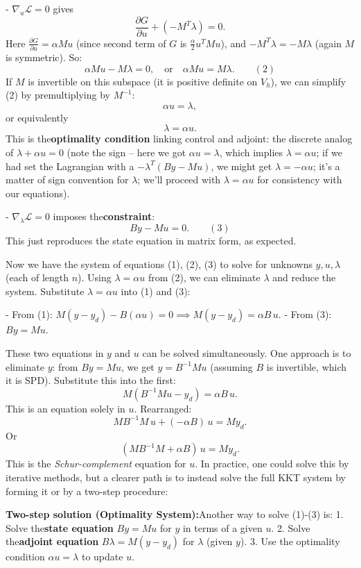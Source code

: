 - \(\nabla_u \mathcal{L} = 0\) gives
\[\frac{\partial G}{\partial u} + (-M^T \lambda) = 0.\]
Here \(\frac{\partial G}{\partial u} = \alpha M u\) (since second term of \(G\) is \(\frac{\alpha}{2} u^T M u\)), and \(-M^T \lambda = -M \lambda\) (again \(M\) is symmetric). So:
\[\alpha M u - M \lambda = 0, \quad \text{or} \quad \alpha M u = M \lambda. \qquad (2)\]
If \(M\) is invertible on this subspace (it is positive definite on \(V_h\)), we can simplify (2) by premultiplying by \(M^{-1}\):
\[\alpha u = \lambda,\]
or equivalently \[\lambda = \alpha u.\]
This is the\textbf{optimality condition} linking control and adjoint: the discrete analog of \(\lambda + \alpha u = 0\) (note the sign – here we got \(\alpha u = \lambda\), which implies \(\lambda = \alpha u\); if we had set the Lagrangian with a \(-\lambda^T(By - Mu)\), we might get \(\lambda = -\alpha u\); it's a matter of sign convention for \(\lambda\); we'll proceed with \(\lambda = \alpha u\) for consistency with our equations).

- \(\nabla_{\lambda} \mathcal{L} = 0\) imposes the\textbf{constraint}:
\[B y - M u = 0. \qquad (3)\]
This just reproduces the state equation in matrix form, as expected.

Now we have the system of equations (1), (2), (3) to solve for unknowns \(y, u, \lambda\) (each of length \(n\)). Using \(\lambda = \alpha u\) from (2), we can eliminate \(\lambda\) and reduce the system. Substitute \(\lambda = \alpha u\) into (1) and (3):

- From (1): \(M(y - y_d) - B(\alpha u) = 0 \implies M(y - y_d) = \alpha B\,u\).
- From (3): \(B y = M u\).

These two equations in \(y\) and \(u\) can be solved simultaneously. One approach is to eliminate \(y\): from \(B y = M u\), we get \(y = B^{-1} M u\) (assuming \(B\) is invertible, which it is SPD). Substitute this into the first:
\[M(B^{-1} M u - y_d) = \alpha B\, u.\]
This is an equation solely in \(u\). Rearranged:
\[M B^{-1} M\, u + (-\alpha B)\, u = M y_d.\]
Or
\[(M B^{-1} M + \alpha B)\, u = M y_d.\]
This is the \emph{Schur-complement} equation for \(u\). In practice, one could solve this by iterative methods, but a clearer path is to instead solve the full KKT system by forming it or by a two-step procedure:

\textbf{Two-step solution (Optimality System):}Another way to solve (1)-(3) is:
1. Solve the\textbf{state equation} \(B y = M u\) for \(y\) in terms of a given \(u\).
2. Solve the\textbf{adjoint equation} \(B \lambda = M(y - y_d)\) for \(\lambda\) (given \(y\)).
3. Use the optimality condition \(\alpha u = \lambda\) to update \(u\).

